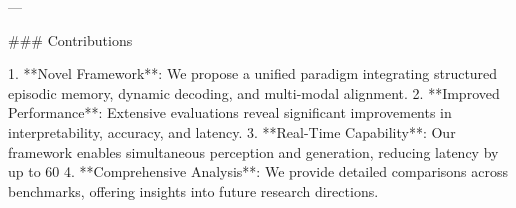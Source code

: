 ---

### Contributions  

1. **Novel Framework**: We propose a unified paradigm integrating structured episodic memory, dynamic decoding, and multi-modal alignment.  
2. **Improved Performance**: Extensive evaluations reveal significant improvements in interpretability, accuracy, and latency.  
3. **Real-Time Capability**: Our framework enables simultaneous perception and generation, reducing latency by up to 60%
4. **Comprehensive Analysis**: We provide detailed comparisons across benchmarks, offering insights into future research directions.

